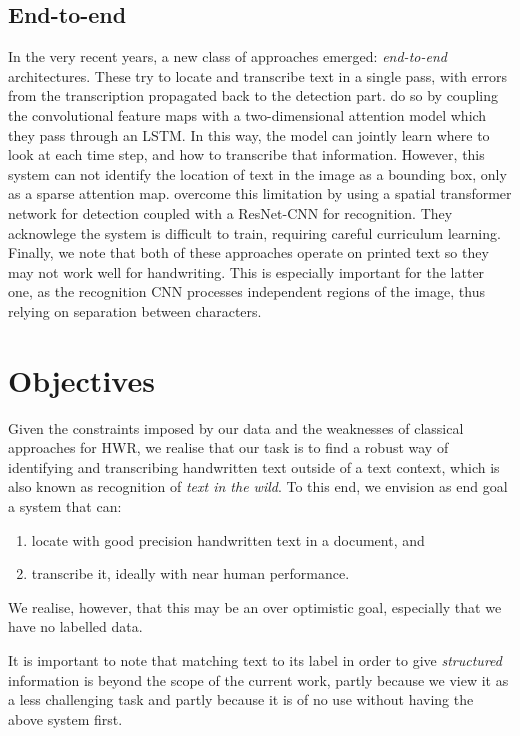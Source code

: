 
	\subsection{End-to-end}\label{sec:related_e2e}
		In the very recent years, a new class of approaches emerged: \emph{end-to-end} architectures. These try to locate and transcribe text in a single pass, with errors from the transcription propagated back to the detection part.  do so by coupling the convolutional feature maps with a two-dimensional attention model which they pass through an LSTM. In this way, the model can jointly learn where to look at each time step, and how to transcribe that information. However, this system can not identify the location of text in the image as a bounding box, only as a sparse attention map.  overcome this limitation by using a spatial transformer network \citep{stn} for detection coupled with a ResNet-CNN for recognition. They acknowlege the system is difficult to train, requiring careful curriculum learning. Finally, we note that both of these approaches operate on printed text so they may not work well for handwriting. This is especially important for the latter one, as the recognition CNN processes independent regions of the image, thus relying on separation between characters.





\section{Objectives}

	Given the constraints imposed by our data and the weaknesses of classical approaches for HWR, we realise that our task is to find a robust way of identifying and transcribing handwritten text outside of a text context, which is also known as recognition of \emph{text in the wild}. To this end, we envision as end goal a system that can:
	\begin{enumerate}
	 	\item locate with good precision handwritten text in a document, and
	 	\item transcribe it, ideally with near human performance.
	\end{enumerate}
	We realise, however, that this may be an over optimistic goal, especially that we have no labelled data.

	It is important to note that matching text to its label in order to give \emph{structured} information is beyond the scope of the current work, partly because we view it as a less challenging task and partly because it is of no use without having the above system first.




